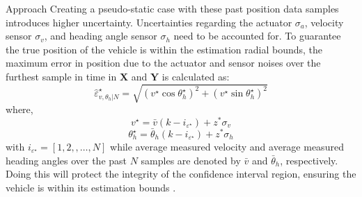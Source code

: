 \begin{section}{Approach}
Creating a pseudo-static case with these past position data samples introduces higher uncertainty. Uncertainties regarding the actuator $\sigma_a$, velocity sensor $\sigma_v$, and heading angle sensor $\sigma_h$ need to be accounted for. To guarantee the true position of the vehicle is within the estimation radial bounds, the maximum error in position due to the actuator and sensor noises over the furthest sample in time in $\mathcal{\bm{X}}$ and $\mathcal{\bm{Y}}$ is calculated as:
    \begin{equation}
	\hat{\varepsilon}_{v,\theta_h|N}^{\star}=\sqrt{(v^{\star}\cos{\theta_h^{\star}})^2+(v^{\star}\sin{\theta_h^{\star}})^2}
	\end{equation}
where,
    \begin{equation}
	v^{\star}=\bar{v}(k-i_{\varepsilon^{\star}})+z^{*}\sigma_v \nonumber
	\end{equation}
	\begin{equation}
	\theta_h^{\star}=\bar{\theta}_h(k-i_{\varepsilon^{\star}})+z^{*}\sigma_h \nonumber
	\end{equation}
with $i_{\varepsilon^{\star}}=[1,2,,\dots,N]$ while average measured velocity and average measured heading angles over the past $N$ samples are denoted by $\bar{v}$ and $\bar{\theta}_h$, respectively. Doing this will protect the integrity of the confidence interval region, ensuring the vehicle is within its estimation bounds .


\end{section}
